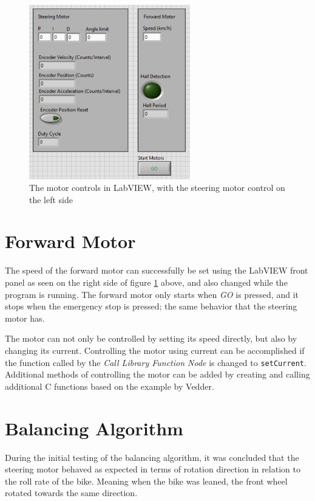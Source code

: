 \begin{figure}[ht]
    \centering
    \includegraphics[width=7cm]{figure/motor_control.png}
    \caption{The motor controls in LabVIEW, with the steering motor control on the left side}
    \label{fig:motorControl}
\end{figure}

\section{Forward Motor}

The speed of the forward motor can successfully be set using the LabVIEW front panel as seen on the right side of figure \ref{fig:motorControl} above, and also changed while the program is running. The forward motor only starts when \textit{GO} is pressed, and it stops when the emergency stop is pressed; the same behavior that the steering motor has. 

The motor can not only be controlled by setting its speed directly, but also by changing its current. Controlling the motor using current can be accomplished if the function called by the \textit{Call Library Function Node} is changed to \texttt{setCurrent}. Additional methods of controlling the motor can be added by creating and calling additional C functions based on the example by Vedder.

\section{Balancing Algorithm} \label{results:balancing}

During the initial testing of the balancing algorithm, it was concluded that the steering motor behaved as expected in terms of rotation direction in relation to the roll rate of the bike. Meaning when the bike was leaned, the front wheel rotated towards the same direction. 

